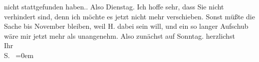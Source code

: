 \begin{ledgroupsized}[t]{13cm}
{{{                  nicht stattgefunden haben.}}}\label{K_L03350-1h}.
               Also Dienstag. Ich hoffe sehr, dass Sie nicht verhindert sind, denn ich möchte es
               jetzt nicht mehr verschieben. Sonst müßte die Sache bis November bleiben, weil H. dabei sein will, und ein so langer Aufschub
               wäre mir jetzt mehr als unangenehm. \pend
           \pstart
           Also zunächst auf Sonntag.\pend
           \pstart
           herzlichst {\\[\baselineskip]}Ihr {\\[\baselineskip]}\spacefill\mbox{S. }\pend
           \leftskip=0em{}
         
         \endnumbering{}\end{ledgroupsized}\begin{anhang}\end{anhang}\newcommand{\dateiname}{L03350}\newcommand{\titel}{Felix Salten an Arthur Schnitzler, [23./24.? 10. 1903]}\newcommand{\editorInnen}{Martin Anton Müller und Laura Untner}
      